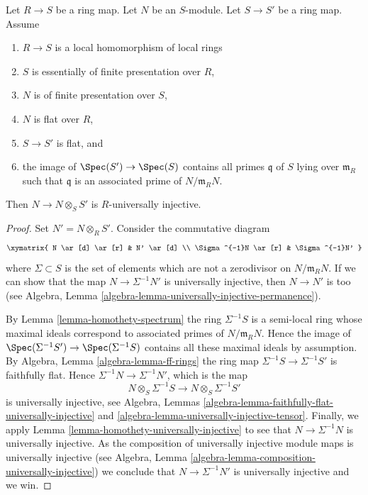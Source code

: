 \begin{lemma}
\label{lemma-base-change-universally-flat-local}
Let $R \to S$ be a ring map.
Let $N$ be an $S$-module.
Let $S \to S'$ be a ring map.
Assume
\begin{enumerate}
\item $R \to S$ is a local homomorphism of local rings
\item $S$ is essentially of finite presentation over $R$,
\item $N$ is of finite presentation over $S$,
\item $N$ is flat over $R$,
\item $S \to S'$ is flat, and
\item the image of $\Spec(S') \to \Spec(S)$ contains
all primes $\mathfrak q$ of $S$ lying over $\mathfrak m_R$
such that $\mathfrak q$ is an associated prime of $N/\mathfrak m_R N$.
\end{enumerate}
Then $N \to N \otimes_S S'$ is $R$-universally injective.
\end{lemma}

\begin{proof}
Set $N' = N \otimes_R S'$. Consider the commutative diagram
$$
\xymatrix{
N \ar[d] \ar[r] & N' \ar[d] \\
\Sigma^{-1}N \ar[r] & \Sigma^{-1}N'
}
$$
where $\Sigma \subset S$ is the set of elements which are not a
zerodivisor on $N/\mathfrak m_R N$. If we can show that the map
$N \to \Sigma^{-1}N'$ is universally injective, then $N \to N'$
is too (see
Algebra, Lemma \ref{algebra-lemma-universally-injective-permanence}).

\medskip\noindent
By
Lemma \ref{lemma-homothety-spectrum}
the ring $\Sigma^{-1}S$ is a semi-local ring whose maximal ideals
correspond to associated primes of $N/\mathfrak m_R N$.
Hence the image of
$\Spec(\Sigma^{-1}S') \to \Spec(\Sigma^{-1}S)$
contains all these maximal ideals by assumption. By
Algebra, Lemma \ref{algebra-lemma-ff-rings}
the ring map $\Sigma^{-1}S \to \Sigma^{-1}S'$ is faithfully flat.
Hence $\Sigma^{-1}N \to \Sigma^{-1}N'$, which is the map
$$
N \otimes_S \Sigma^{-1}S \longrightarrow N \otimes_S \Sigma^{-1}S'
$$
is universally injective, see
Algebra, Lemmas \ref{algebra-lemma-faithfully-flat-universally-injective} and
\ref{algebra-lemma-universally-injective-tensor}.
Finally, we apply
Lemma \ref{lemma-homothety-universally-injective}
to see that $N \to \Sigma^{-1}N$ is universally injective.
As the composition of universally injective module maps is universally
injective (see
Algebra, Lemma \ref{algebra-lemma-composition-universally-injective})
we conclude that $N \to \Sigma^{-1}N'$ is universally injective and we win.
\end{proof}
